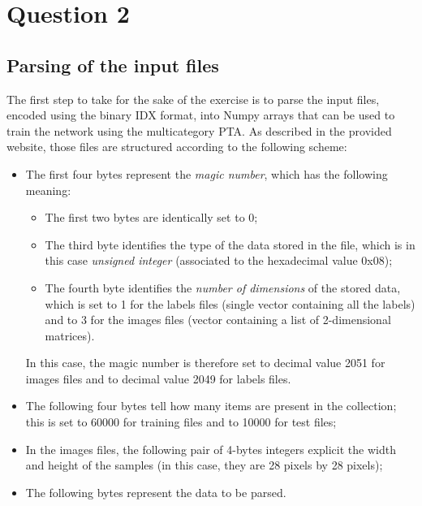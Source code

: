 \documentclass[letterpaper,headings=standardclasses]{scrartcl}
\begin{document}

\section{Question 2}

\subsection{Parsing of the input files}

The first step to take for the sake of the exercise is to parse the input files, encoded using the binary IDX format, into Numpy arrays that can be used to train the network using the multicategory PTA. As described in the provided website, those files are structured according to the following scheme:

\begin{itemize}

\item The first four bytes represent the \emph{magic number}, which has the following meaning:

\begin{itemize}

\item The first two bytes are identically set to 0;

\item The third byte identifies the type of the data stored in the file, which is in this case \emph{unsigned integer} (associated to the hexadecimal value 0x08);

\item The fourth byte identifies the \emph{number of dimensions} of the stored data, which is set to 1 for the labels files (single vector containing all the labels) and to 3 for the images files (vector containing a list of 2-dimensional matrices).

\end{itemize}

In this case, the magic number is therefore set to decimal value 2051 for images files and to decimal value 2049 for labels files.

\item The following four bytes tell how many items are present in the collection; this is set to 60000 for training files and to 10000 for test files;

\item In the images files, the following pair of 4-bytes integers explicit the width and height of the samples (in this case, they are 28 pixels by 28 pixels);

\item The following bytes represent the data to be parsed.

\end{itemize}
\end{document}
